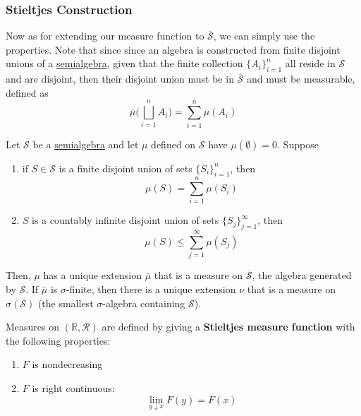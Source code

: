 \subsubsection{Stieltjes Construction}

  Now as for extending our measure function to $\overline{\mathcal{S}}$, we can simply use the properties. Note that since since an algebra is constructed from finite disjoint unions of a \hyperref[def:semialgebra]{semialgebra}, given that the finite collection $\{A_i\}_{i=1}^n$ all reside in $\mathcal{S}$ and are disjoint, then their disjoint union must be in $\overline{\mathcal{S}}$ and must be measurable, defined as 
  \begin{equation}
    \overline{\mu} \bigg( \bigsqcup_{i=1}^n A_i \bigg) = \sum_{i=1}^n \mu(A_i)
  \end{equation}

  \begin{theorem}
    \label{thm:extending-a-premeasure-from-a-semialgebra}
    Let $\mathcal{S}$ be a \hyperref[def:semialgebra]{semialgebra} and let $\mu$ defined on $\mathcal{S}$ have $\mu(\emptyset) = 0$. Suppose 
    \begin{enumerate}
      \item if $S \in \mathcal{S}$ is a finite disjoint union of sets $\{S_i\}_{i=1}^n$, then 
      \begin{equation}
        \mu(S) = \sum_{i=1}^n \mu(S_i)
      \end{equation}
      \item $S$ is a countably infinite disjoint union of sets $\{S_j\}_{j=1}^\infty$, then 
      \begin{equation}
        \mu(S) \leq \sum_{j=1}^\infty \mu(S_j)
      \end{equation}
    \end{enumerate}
    Then, $\mu$ has a unique extension $\bar{\mu}$ that is a measure on $\overline{\mathcal{S}}$, the algebra generated by $\mathcal{S}$. If $\bar{\mu}$ is $\sigma$-finite, then there is a unique extension $\nu$ that is a measure on $\sigma(\mathcal{S})$ (the smallest $\sigma$-algebra containing $\mathcal{S}$). 
  \end{theorem}

  \begin{example}
    \label{ex:stieltjes-measure-function}
    Measures on $(\mathbb{R}, \mathcal{R})$ are defined by giving a \textbf{Stieltjes measure function} with the following properties: 
    \begin{enumerate}
      \item $F$ is nondecreasing 
      \item $F$ is right continuous: 
      \begin{equation}
        \lim_{y \downarrow x} F(y) = F(x)
      \end{equation}
    \end{enumerate}
  \end{example}

